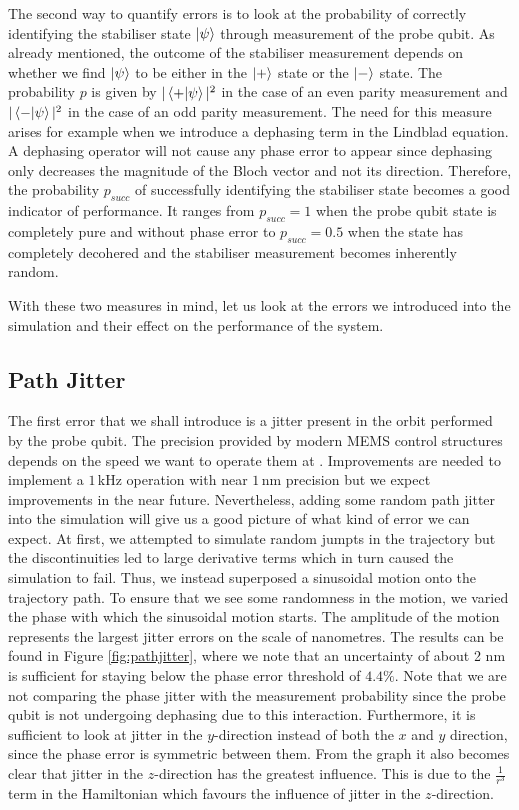 The second way to quantify errors is to look at the probability of correctly identifying the stabiliser state  $\ket{\psi}$ through measurement of the probe qubit. As already mentioned, the outcome of the stabiliser measurement depends on whether we find $\ket{\psi}$ to be either in the $\ket{+}$ state or the $\ket{-}$ state. The probability $p$ is given by $|\left\langle +|\psi \right\rangle|^2$ in the case of an even parity measurement and $|\left\langle - |\psi \right\rangle|^2$ in the case of an odd parity measurement. The need for this measure arises for example when we introduce a dephasing term in the Lindblad equation. A dephasing operator will not cause any phase error to appear since dephasing only decreases the magnitude of the Bloch vector and not its direction. Therefore, the probability $p_{succ}$ of successfully identifying the stabiliser state becomes a good indicator of performance. It ranges from $p_{succ} = 1$ when the probe qubit state is completely pure and without phase error to $p_{succ} = 0.5$ when the state has completely decohered and the stabiliser measurement becomes inherently random. 

With these two measures in mind, let us look at the errors we introduced into the simulation and their effect on the performance of the system. 




\subsection{Path Jitter}\label{sec:jitter}
The first error that we shall introduce is a jitter present in the orbit performed by the probe qubit. The precision provided by modern MEMS control structures depends on the speed we want to operate them at \cite{Chu2003,Koo2012}. Improvements are needed to implement a $1\, $kHz operation with near $1\, $nm precision but we expect improvements in the near future. Nevertheless, adding some random path jitter into the simulation will give us a good picture of what kind of error we can expect. At first, we attempted to simulate random jumpts in the trajectory but the discontinuities led to large derivative terms which in turn caused the simulation to fail. Thus,  we instead superposed a sinusoidal motion onto the trajectory path. To ensure that we see some randomness in the motion, we varied the phase with which the sinusoidal motion starts. The amplitude of the motion represents the largest jitter errors on the scale of nanometres. The results can be found in Figure \ref{fig:pathjitter}, where we note that an uncertainty of about 2 nm is sufficient for staying below the phase error threshold of $4.4 \%$. Note that we are not comparing the phase jitter with the measurement probability since the probe qubit is not undergoing dephasing due to this interaction. Furthermore, it is sufficient to look at jitter in the $y$-direction instead of both the $x$ and $y$ direction, since the phase error is symmetric between them. 
From the graph it also becomes clear that jitter in the $z$-direction has the greatest influence. This is due to the $\frac{1}{r^3}$  term in the Hamiltonian which favours the influence of jitter in the $z$-direction. 




